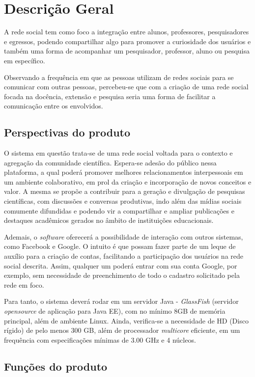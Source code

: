 \chapter{Descrição Geral}
A rede social tem como foco a integração entre alunos, professores, pesquisadores e egressos, 
podendo compartilhar algo para promover a curiosidade dos usuários e também uma forma de acompanhar um pesquisador, professor, aluno ou pesquisa em específico. 	

Observando a frequência em que as pessoas utilizam de redes sociais para se comunicar com outras pessoas, percebeu-se que com a criação de uma rede social focada na docência, extensão e pesquisa seria uma forma de facilitar a comunicação entre os envolvidos. 


\section{Perspectivas do produto}

O sistema em questão trata-se de uma rede social voltada para o contexto e agregação da comunidade científica. Espera-se adesão do público nessa plataforma, a qual poderá promover melhores relacionamentos interpessoais em um ambiente colaborativo, em prol da criação e incorporação de novos conceitos e valor. A mesma se propõe a contribuir para a geração e divulgação de pesquisas científicas, com discussões e conversas produtivas, indo além das mídias sociais comumente difundidas e podendo vir a compartilhar e ampliar publicações e destaques acadêmicos gerados no âmbito de instituições educacionais.

Ademais, o \textit{software} oferecerá a possibilidade de interação com outros sistemas, como Facebook e Google. O intuito é que possam fazer parte de um leque de auxílio para a criação de contas, facilitando a participação dos usuários na rede social descrita. Assim, qualquer um poderá entrar com sua conta Google, por exemplo, sem necessidade de preenchimento de todo o cadastro solicitado pela rede em foco.

Para tanto, o sistema deverá rodar em um servidor Java - \textit{GlassFish} (servidor \textit{opensource} de aplicação para Java EE), com no mínimo 8GB de memória principal, além de ambiente Linux. Ainda, verifica-se a necessidade de HD (Disco rígido) de pelo menos 300 GB, além de processador \textit{multicore} eficiente, em um frequência com especificações mínimas de 3.00 GHz e 4 núcleos. 


\section{Funções do produto}


